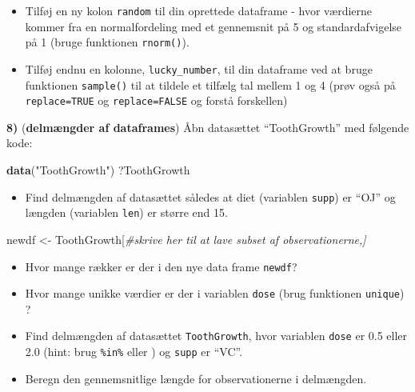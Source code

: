 \documentclass[
]{book}
\newenvironment{Shaded}{\begin{snugshade}}{\end{snugshade}}
\newcommand{\CommentTok}[1]{\textcolor[rgb]{0.37,0.37,0.37}{\textit{#1}}}
\newcommand{\FunctionTok}[1]{\textcolor[rgb]{0.27,0.27,0.27}{\textbf{#1}}}
\newcommand{\NormalTok}[1]{#1}
\newcommand{\OtherTok}[1]{\textcolor[rgb]{0.37,0.37,0.37}{#1}}
\newcommand{\SpecialCharTok}[1]{\textcolor[rgb]{0.43,0.43,0.43}{\textbf{#1}}}
\newcommand{\StringTok}[1]{\textcolor[rgb]{0.5,0.5,0.5}{#1}}
\providecommand{\tightlist}{%
  \setlength{\itemsep}{0pt}\setlength{\parskip}{0pt}}
\begin{document}
\begin{itemize}
\tightlist
\item
  Tilføj en ny kolon \texttt{random} til din oprettede dataframe - hvor værdierne kommer fra en normalfordeling med et gennemsnit på 5 og standardafvigelse på 1 (bruge funktionen \texttt{rnorm()}).
\end{itemize}

\begin{Shaded}
\end{Shaded}

\begin{itemize}
\tightlist
\item
  Tilføj endnu en kolonne, \texttt{lucky\_number}, til din dataframe ved at bruge funktionen \texttt{sample()} til at tildele et tilfælg tal mellem 1 og 4 (prøv også på \texttt{replace=TRUE} og \texttt{replace=FALSE} og forstå forskellen)
\end{itemize}

\textbf{8)} (\textbf{delmængder af dataframes}) Åbn datasættet ``ToothGrowth'' med følgende kode:

\begin{Shaded}
\begin{Highlighting}[]
\FunctionTok{data}\NormalTok{(}\StringTok{"ToothGrowth"}\NormalTok{)}
\NormalTok{?ToothGrowth}
\end{Highlighting}
\end{Shaded}

\begin{itemize}
\tightlist
\item
  Find delmængden af datasættet således at diet (variablen \texttt{supp}) er ``OJ'' og længden (variablen \texttt{len}) er større end 15.
\end{itemize}

\begin{Shaded}
\begin{Highlighting}[]
\NormalTok{newdf }\OtherTok{\textless{}{-}}\NormalTok{ ToothGrowth[}\CommentTok{\#skrive her til at lave subset af observationerne,]}
\end{Highlighting}
\end{Shaded}

\begin{itemize}
\tightlist
\item
  Hvor mange rækker er der i den nye data frame \texttt{newdf}?
\item
  Hvor mange unikke værdier er der i variablen \texttt{dose} (brug funktionen \texttt{unique}) ?
\item
  Find delmængden af datasættet \texttt{ToothGrowth}, hvor variablen \texttt{dose} er 0.5 eller 2.0 (hint: brug \texttt{\%in\%} eller \texttt{\textbar{}}) og \texttt{supp} er ``VC''.
\item
  Beregn den gennemsnitlige længde for observationerne i delmængden.
\end{itemize}
\end{document}
